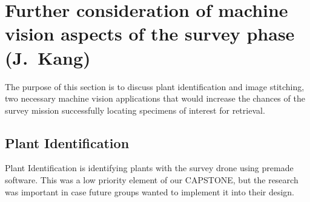 \section{Further consideration of machine vision aspects of the survey phase (J.~Kang)}
\label{sec:vision}

The purpose of this section is to discuss plant identification and image stitching, two necessary machine vision applications that would increase the chances of the survey mission successfully locating specimens of interest for retrieval. 

\subsection{Plant Identification}
Plant Identification is identifying plants with the survey drone using premade software. This was a low priority element of our CAPSTONE, but the research was important in case future groups wanted to implement it into their design. 

